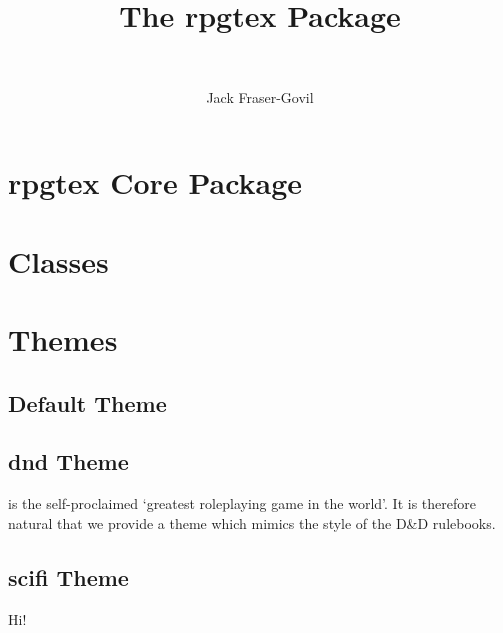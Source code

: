 \documentclass[11pt,theme=default]{rpgbook}
\title{The rpgtex Package}
\subtitle{~}
\author{Jack Fraser-Govil}
\begin{document}
	\frontmatter
	\maketitle{}

	\tableofcontents
	\mainmatter{}


	\part{rpgtex Core Package}

	\part{Classes}
		\chapter{}
	\part{Themes}
	\chapter{Default Theme}

		\chapter{dnd Theme}

			 is the self-proclaimed `greatest roleplaying game in the world'. It is therefore natural that we provide a theme which mimics the style of the D\&D rulebooks. \blindtext

	\chapter{scifi Theme}
		Hi!
\end{document}
